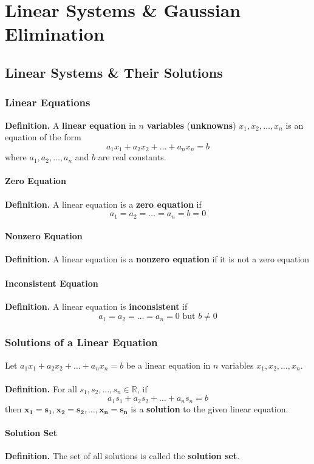 \documentclass[../ma2001_notes.tex]{subfiles}
\begin{document}
\chapter{Linear Systems \& Gaussian Elimination}

\section{Linear Systems \& Their Solutions}
\subsection{Linear Equations}
\textbf{Definition.} A \textbf{linear equation} in \(n\) \textbf{variables} (\textbf{unknowns}) \(x_1, x_2, \ldots, x_n\) is an equation of the form
\[a_1x_1+a_2x_2+\ldots+a_nx_n=b\]
where \(a_1, a_2, \ldots, a_n\) and \(b\) are real constants.

\subsubsection{Zero Equation}
\textbf{Definition.} A linear equation is a \textbf{zero equation} if
\[a_1=a_2=\ldots=a_n=b=0\]

\subsubsection{Nonzero Equation}
\textbf{Definition.} A linear equation is a \textbf{nonzero equation} if it is not a zero equation

\subsubsection{Inconsistent Equation}
\textbf{Definition.} A linear equation is \textbf{inconsistent} if
\[a_1=a_2=\ldots=a_n=0 \text{ but } b\ne0\]

\subsection{Solutions of a Linear Equation}
Let \(a_1x_1+a_2x_2+\ldots+a_nx_n=b\) be a linear equation in \(n\) variables \(x_1,x_2,\ldots,x_n\). \\ \\
\textbf{Definition.} For all \(s_1, s_2,\ldots,s_n\in\mathbb{R}\), if
\[a_1s_1+a_2s_2+\ldots+a_ns_n=b\]
then \(\bm{x_1=s_1, x_2=s_2, \ldots, x_n=s_n}\) is a \textbf{solution} to the given linear equation.

\subsubsection{Solution Set}
\textbf{Definition.} The set of all solutions is called the \textbf{solution set}.
\end{document}
